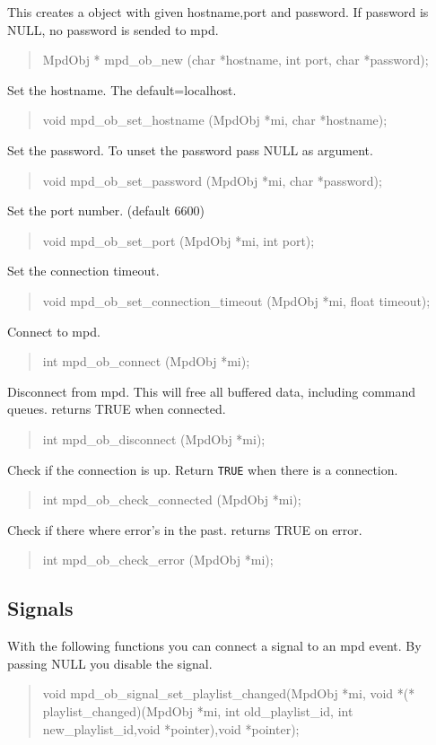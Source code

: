 \documentclass[a4paper,11pt]{article}
\begin{document}
This creates a object with given hostname,port and password. If password is NULL, no password is sended to mpd.
\begin{quote}
MpdObj * mpd\_ob\_new (char *hostname, int port, char *password); 
\end{quote}
Set the hostname. The default=localhost.
\begin{quote}
void mpd\_ob\_set\_hostname (MpdObj *mi, char *hostname); 
\end{quote}
Set the password. To unset the password pass NULL as argument.
\begin{quote}
void mpd\_ob\_set\_password (MpdObj *mi, char *password); 
\end{quote}
Set the port number. (default 6600)
\begin{quote}
void mpd\_ob\_set\_port (MpdObj *mi, int port); 
\end{quote}
Set the connection timeout.
\begin{quote}
void mpd\_ob\_set\_connection\_timeout (MpdObj *mi, float timeout);
\end{quote}
Connect to mpd.
\begin{quote}
int mpd\_ob\_connect (MpdObj *mi); 
\end{quote}
Disconnect from mpd. This will free all buffered data, including command queues.
returns TRUE when connected.
\begin{quote}
int mpd\_ob\_disconnect (MpdObj *mi);
\end{quote}
Check if the connection is up.
Return \verb|TRUE| when there is a connection.
\begin{quote}
int mpd\_ob\_check\_connected (MpdObj *mi); 
\end{quote}
Check if there where error's in the past.
returns TRUE on error.
\begin{quote}
int mpd\_ob\_check\_error (MpdObj *mi);
\end{quote}





\subsection{Signals}

With the following functions you can connect a signal to an mpd event. By passing NULL you disable the signal.\\

\begin{quote}
void mpd\_ob\_signal\_set\_playlist\_changed(MpdObj *mi, void *(* playlist\_changed)(MpdObj *mi, int old\_playlist\_id, int new\_playlist\_id,void *pointer),void *pointer);
\end{quote}
\end{document}

